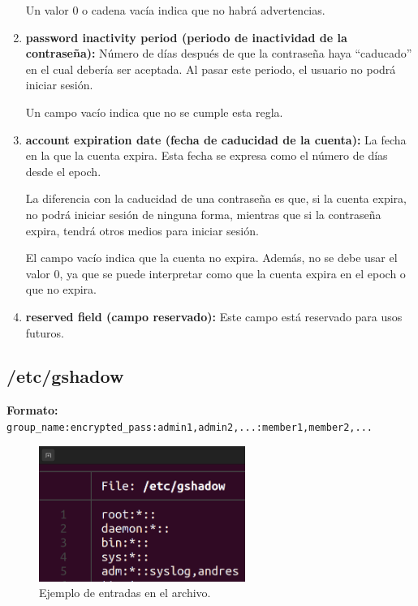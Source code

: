 \documentclass{article}
\begin{document}
\begin{enumerate}
    Un valor 0 o cadena vacía indica que no habrá advertencias.

    \item \textbf{password inactivity period (periodo de inactividad de la contraseña): }Número de días después de que la contraseña haya ``caducado'' en el cual debería ser aceptada. Al pasar este periodo, el usuario no podrá iniciar sesión.
    
    Un campo vacío indica que no se cumple esta regla.

    \item  \textbf{account expiration date (fecha de caducidad de la cuenta): }La fecha en la que la cuenta expira. Esta fecha se expresa como el número de días desde el epoch.
    
    La diferencia con la caducidad de una contraseña es que, si la cuenta expira, no podrá iniciar sesión de ninguna forma, mientras que si la contraseña expira, tendrá otros medios para iniciar sesión.

    El campo vacío indica que la cuenta no expira. Además, no se debe usar el valor 0, ya que se puede interpretar como que la cuenta expira en el epoch o que no expira.

    \item \textbf{reserved field (campo reservado): }Este campo está reservado para usos futuros.
\end{enumerate}


\subsection{/etc/gshadow}
\textbf{Formato: }\verb|group_name:encrypted_pass:admin1,admin2,...:member1,member2,...|

\bigskip

\begin{figure}[H]
    \centering
    \includegraphics[width=0.6\textwidth]{imagenes/gshadowfile.png}
    \caption{Ejemplo de entradas en el archivo.}    
\end{figure}
\end{document}

